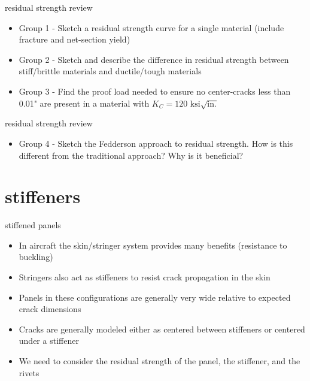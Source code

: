 \documentclass[
  letterpaper,
  ignorenonframetext,
  aspectratio=43,
  handout,
  12pt]{beamer}
\providecommand{\tightlist}{%
  \setlength{\itemsep}{0pt}\setlength{\parskip}{0pt}}
\providecommand{\tightlist}{%
\setlength{\itemsep}{0pt}\setlength{\parskip}{0pt}}
\begin{document}
\begin{frame}{residual strength review}
\protect\hypertarget{residual-strength-review-1}{}
\begin{itemize}
\tightlist
\item
  Group 1 - Sketch a residual strength curve for a single material
  (include fracture and net-section yield)
\item
  Group 2 - Sketch and describe the difference in residual strength
  between stiff/brittle materials and ductile/tough materials
\item
  Group 3 - Find the proof load needed to ensure no center-cracks less
  than 0.01" are present in a material with
  \(K_C = 120 \text{ ksi}\sqrt{\text{in.}}\)
\end{itemize}
\end{frame}

\begin{frame}{residual strength review}
\protect\hypertarget{residual-strength-review-2}{}
\begin{itemize}
\tightlist
\item
  Group 4 - Sketch the Fedderson approach to residual strength. How is
  this different from the traditional approach? Why is it beneficial?
\end{itemize}
\end{frame}

\hypertarget{stiffeners}{%
\section{stiffeners}\label{stiffeners}}

\begin{frame}{stiffened panels}
\protect\hypertarget{stiffened-panels}{}
\begin{itemize}
\tightlist
\item
  In aircraft the skin/stringer system provides many benefits
  (resistance to buckling)
\item
  Stringers also act as stiffeners to resist crack propagation in the
  skin
\item
  Panels in these configurations are generally very wide relative to
  expected crack dimensions
\item
  Cracks are generally modeled either as centered between stiffeners or
  centered under a stiffener
\item
  We need to consider the residual strength of the panel, the stiffener,
  and the rivets
\end{itemize}
\end{frame}
\end{document}
